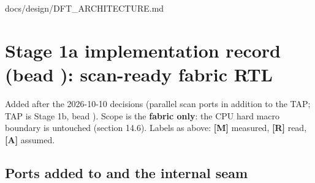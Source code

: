 \begin{relocated}{docs/design/DFT_ARCHITECTURE.md}
\section{\texorpdfstring{Stage 1a implementation record (bead
): scan-ready fabric
RTL}{Stage 1a implementation record (bead ): scan-ready fabric RTL}}\label{tm:ch:dft-architecture:14-stage-1a-implementation-record-bead-j41m2-scan-ready-fabric-rtl}

Added after the 2026-10-10 decisions (parallel scan ports in addition to
the TAP; TAP is Stage 1b, bead ). Scope is the
\textbf{fabric only}: the CPU hard macro boundary is untouched (section
14.6). Labels as above: \textbf{{[}M{]}} measured, \textbf{{[}R{]}}
read, \textbf{{[}A{]}} assumed.

\subsection{\texorpdfstring{Ports added to  and the
internal seam}{Ports added to  and the internal seam}}\label{tm:ch:dft-architecture:141-ports-added-to-soc-top-and-the-internal-seam}

{\small\setlength{\tabcolsep}{4pt}

}
\end{relocated}

